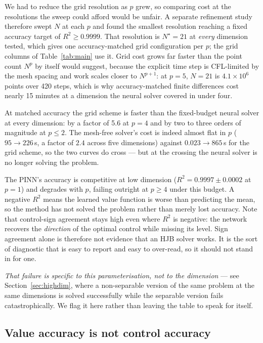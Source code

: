 \documentclass[conference]{IEEEtran}
\begin{document}
We had to reduce the grid resolution as $p$ grew, so comparing cost at the resolutions the sweep
could afford would be unfair. A separate refinement study therefore swept $N$ at
each $p$ and found the smallest resolution reaching a fixed accuracy target of $R^2 \ge 0.9999$.
That resolution is $N^\star = 21$ at \emph{every} dimension tested, which gives one
accuracy-matched grid configuration per $p$; the grid columns of Table~\ref{tab:main} use it.
Grid cost grows far faster than the point count $N^p$ by itself would suggest, because the explicit time
step is CFL-limited by the mesh spacing and work scales closer to $N^{p+1}$: at $p=5$, $N=21$ is
$4.1\times10^6$ points over 420 steps, which is why accuracy-matched finite differences cost
nearly 15 minutes at a dimension the neural solver covered in under four.

At matched accuracy the grid scheme is faster than the fixed-budget neural solver at every
dimension: by a factor of 5.6 at $p=4$ and by two to three orders of magnitude at $p \le 2$. The
mesh-free solver's cost is indeed almost flat in $p$ ($95 \rightarrow 226$\,s, a factor of $2.4$
across five dimensions) against $0.023 \rightarrow 865$\,s for the grid scheme, so the two curves
do cross --- but at the crossing the neural solver is no longer solving the problem.

The PINN's accuracy is competitive at low dimension ($R^2 = 0.9997 \pm 0.0002$ at $p=1$) and
degrades with $p$, failing outright at $p \ge 4$ under this budget. A negative $R^2$ means the
learned value function is worse than predicting the mean, so the method has not solved the
problem rather than merely lost accuracy. Note that control-sign agreement stays high even where
$R^2$ is negative: the network recovers the \emph{direction} of the optimal control while missing
its level. Sign agreement alone is therefore not evidence that an HJB solver works. It is the sort
of diagnostic that is easy to report and easy to over-read, so it should not stand in for one.

\emph{That failure is specific to this parameterisation, not to the dimension} --- see
Section~\ref{sec:highdim}, where a non-separable version of the same problem at the same
dimensions is solved successfully while the separable version fails catastrophically. We flag it
here rather than leaving the table to speak for itself.

\subsection{Value accuracy is not control accuracy}\label{sec:control}
\end{document}

